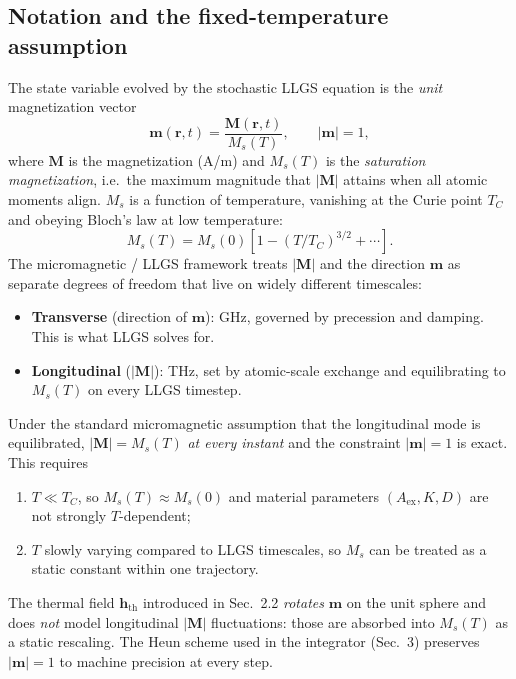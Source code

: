 \documentclass[11pt,a4paper]{article}
\newcommand{\mb}[1]{\mathbf{#1}}
\newcommand{\hth}{\mb{h}_{\text{th}}}
\newcommand{\Aex}{A_{\text{ex}}}
\begin{document}
\subsection{Notation and the fixed-temperature assumption}
\label{sec:notation_fixed_T}

The state variable evolved by the stochastic LLGS equation is the
\emph{unit} magnetization vector
%
\begin{equation}
\mb{m}(\mb{r}, t) = \frac{\mb{M}(\mb{r}, t)}{M_s(T)},
\qquad |\mb{m}| = 1,
\end{equation}
%
where $\mb{M}$ is the magnetization (A/m) and $M_s(T)$ is the
\emph{saturation magnetization}, i.e.\ the maximum magnitude that
$|\mb{M}|$ attains when all atomic moments align. $M_s$ is a function
of temperature, vanishing at the Curie point $T_C$ and obeying Bloch's
law at low temperature:
%
\begin{equation}\label{eq:bloch}
M_s(T) = M_s(0) \left[1 - (T/T_C)^{3/2} + \cdots \right].
\end{equation}
%
The micromagnetic / LLGS framework treats $|\mb{M}|$ and the direction
$\mb{m}$ as separate degrees of freedom that live on widely different
timescales:
%
\begin{itemize}[leftmargin=2em, nosep]
    \item \textbf{Transverse} (direction of $\mb{m}$): GHz, governed
        by precession and damping. This is what LLGS solves for.
    \item \textbf{Longitudinal} ($|\mb{M}|$): THz, set by atomic-scale
        exchange and equilibrating to $M_s(T)$ on every LLGS timestep.
\end{itemize}
%
Under the standard micromagnetic assumption that the longitudinal mode
is equilibrated, $|\mb{M}| = M_s(T)$ \emph{at every instant} and the
constraint $|\mb{m}| = 1$ is exact. This requires
%
\begin{enumerate}[leftmargin=2em, nosep]
    \item $T \ll T_C$, so $M_s(T) \approx M_s(0)$ and material
        parameters $(\Aex, K, D)$ are not strongly $T$-dependent;
    \item $T$ slowly varying compared to LLGS timescales, so $M_s$ can
        be treated as a static constant within one trajectory.
\end{enumerate}
%
The thermal field $\hth$ introduced in Sec.~2.2 \emph{rotates} $\mb{m}$
on the unit sphere and does \emph{not} model longitudinal $|\mb{M}|$
fluctuations: those are absorbed into $M_s(T)$ as a static rescaling.
The Heun scheme used in the integrator (Sec.~3) preserves
$|\mb{m}|=1$ to machine precision at every step.
%
\end{document}

